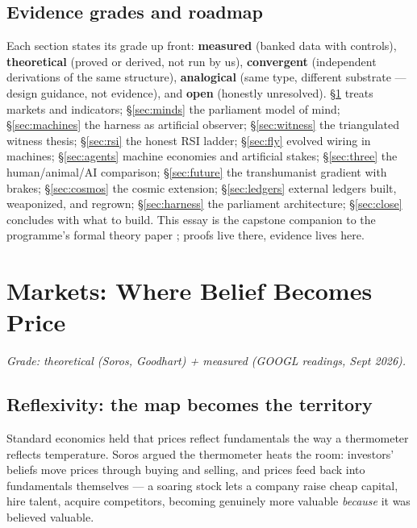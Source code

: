 \documentclass[11pt]{article}
\begin{document}
\subsection*{Evidence grades and roadmap}

Each section states its grade up front: \textbf{measured} (banked data with controls), \textbf{theoretical} (proved or derived, not run by us), \textbf{convergent} (independent derivations of the same structure), \textbf{analogical} (same type, different substrate --- design guidance, not evidence), and \textbf{open} (honestly unresolved). \S\ref{sec:markets} treats markets and indicators; \S\ref{sec:minds} the parliament model of mind; \S\ref{sec:machines} the harness as artificial observer; \S\ref{sec:witness} the triangulated witness thesis; \S\ref{sec:rsi} the honest RSI ladder; \S\ref{sec:fly} evolved wiring in machines; \S\ref{sec:agents} machine economies and artificial stakes; \S\ref{sec:three} the human/animal/AI comparison; \S\ref{sec:future} the transhumanist gradient with brakes; \S\ref{sec:cosmos} the cosmic extension; \S\ref{sec:ledgers} external ledgers built, weaponized, and regrown; \S\ref{sec:harness} the parliament architecture; \S\ref{sec:close} concludes with what to build. This essay is the capstone companion to the programme's formal theory paper \citep{paper-v4}; proofs live there, evidence lives here.

\section{Markets: Where Belief Becomes Price}
\label{sec:markets}

\textit{Grade: theoretical (Soros, Goodhart) + measured (GOOGL readings, Sept 2026).}

\subsection{Reflexivity: the map becomes the territory}

Standard economics held that prices reflect fundamentals the way a thermometer reflects temperature. Soros \citep{soros} argued the thermometer heats the room: investors' beliefs move prices through buying and selling, and prices feed back into fundamentals themselves --- a soaring stock lets a company raise cheap capital, hire talent, acquire competitors, becoming genuinely more valuable \emph{because} it was believed valuable.
\end{document}
